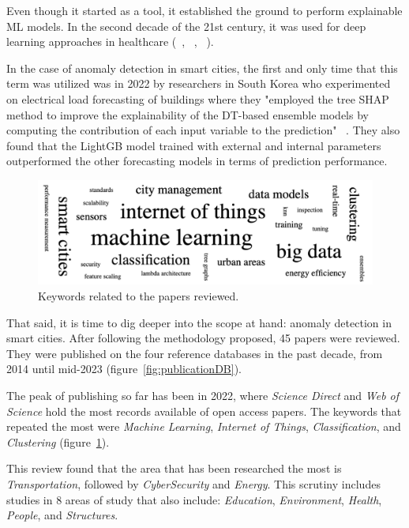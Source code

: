 \documentclass[a4paper,12pt,twoside]{ThesisStyle}
\begin{document}
Even though it started as a tool, it established the ground to perform explainable ML models. In the second decade of the 21st century, it was used for deep learning approaches in healthcare (~\cite{LAMY201942}, ~\cite{SABOL2020103523}, ~\cite{KAVYA2021102681}). 

In the case of anomaly detection in smart cities, the first and only time that this term was utilized was in 2022 by researchers in South Korea who experimented on electrical load forecasting of buildings where they "employed the tree SHAP method to improve the explainability of the DT-based ensemble models by computing the contribution of each input variable to the prediction" ~\cite{moon2022toward}. They also found that the LightGB model trained with external and internal parameters outperformed the other forecasting models in terms of prediction performance.

\begin{figure}[htb]
\centering
\includegraphics[width=13 cm]{imatges/keywordsDB.png}
\caption{\label{fig:keywordsDB} Keywords related to the papers reviewed.}
\end{figure}

That said, it is time to dig deeper into the scope at hand: anomaly detection in smart cities. After following the methodology proposed, 45 papers were reviewed. They were published on the four reference databases in the past decade, from 2014 until mid-2023 (figure~\ref{fig:publicationDB}). 

The peak of publishing so far has been in 2022, where \textit{Science Direct} and \textit{Web of Science} hold the most records available of open access papers. The keywords that repeated the most were \textit{Machine Learning}, \textit{Internet of Things}, \textit{Classification}, and \textit{Clustering} (figure~\ref{fig:keywordsDB}).

This review found that the area that has been researched the most is \textit{Transportation}, followed by \textit{CyberSecurity} and \textit{Energy}. This scrutiny
includes studies in 8 areas of study that also include: \textit{Education}, \textit{Environment}, \textit{Health}, \textit{People}, and \textit{Structures}.
\end{document}
